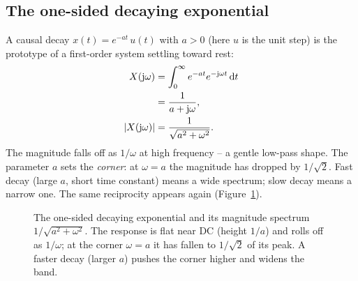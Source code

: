 \subsection{The one-sided decaying exponential}
A causal decay $x(t) = e^{-at}\,u(t)$ with $a>0$ (here $u$ is the unit step) is the
prototype of a first-order system settling toward rest:
\begin{align}
X(\mathrm{j}\omega) &= \int_0^{\infty} e^{-at}e^{-\mathrm{j}\omega t}\,\mathrm{d} t \notag \\
&= \frac{1}{a+\mathrm{j}\omega}, \notag \\
\lvert X(\mathrm{j}\omega)\rvert &= \frac{1}{\sqrt{a^2+\omega^2}} .
\end{align}
The magnitude falls off as $1/\omega$ at high frequency -- a gentle low-pass shape. The
parameter $a$ sets the \emph{corner}: at $\omega=a$ the magnitude has dropped by
$1/\sqrt2$. Fast decay (large $a$, short time constant) means a wide spectrum; slow decay
means a narrow one. The same reciprocity appears again (Figure~\ref{ch07:fig-decay}).

\begin{figure}[H]
\centering
{}
\caption{The one-sided decaying exponential and its magnitude spectrum
$1/\sqrt{a^2+\omega^2}$. The response is flat near DC (height $1/a$) and rolls off as
$1/\omega$; at the corner $\omega=a$ it has fallen to $1/\sqrt2$ of its peak. A faster
decay (larger $a$) pushes the corner higher and widens the band.}
\label{ch07:fig-decay}
\end{figure}

